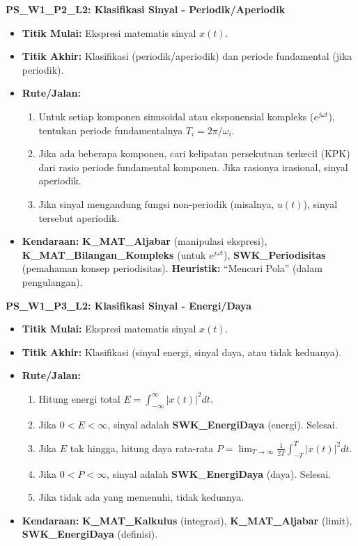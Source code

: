 \documentclass[
  letterpaper,
  DIV=11,
  numbers=noendperiod]{scrreprt}
\providecommand{\tightlist}{%
  \setlength{\itemsep}{0pt}\setlength{\parskip}{0pt}}\usepackage{longtable,booktabs,array}
\begin{document}
\textbf{PS\_W1\_P2\_L2: Klasifikasi Sinyal - Periodik/Aperiodik}

\begin{itemize}
\tightlist
\item
  \textbf{Titik Mulai:} Ekspresi matematis sinyal \(x(t)\).
\item
  \textbf{Titik Akhir:} Klasifikasi (periodik/aperiodik) dan periode
  fundamental (jika periodik).
\item
  \textbf{Rute/Jalan:}

  \begin{enumerate}
  \def\labelenumi{\arabic{enumi}.}
  \tightlist
  \item
    Untuk setiap komponen sinusoidal atau eksponensial kompleks
    (\(e^{j\omega t}\)), tentukan periode fundamentalnya
    \(T_i = 2\pi / \omega_i\).
  \item
    Jika ada beberapa komponen, cari kelipatan persekutuan terkecil
    (KPK) dari rasio periode fundamental komponen. Jika rasionya
    irasional, sinyal aperiodik.
  \item
    Jika sinyal mengandung fungsi non-periodik (misalnya, \(u(t)\)),
    sinyal tersebut aperiodik.
  \end{enumerate}
\item
  \textbf{Kendaraan:} \textbf{K\_MAT\_Aljabar} (manipulasi ekspresi),
  \textbf{K\_MAT\_Bilangan\_Kompleks} (untuk \(e^{j\omega t}\)),
  \textbf{SWK\_Periodisitas} (pemahaman konsep periodisitas).
  \textbf{Heuristik:} ``Mencari Pola'' (dalam pengulangan).
\end{itemize}

\textbf{PS\_W1\_P3\_L2: Klasifikasi Sinyal - Energi/Daya}

\begin{itemize}
\tightlist
\item
  \textbf{Titik Mulai:} Ekspresi matematis sinyal \(x(t)\).
\item
  \textbf{Titik Akhir:} Klasifikasi (sinyal energi, sinyal daya, atau
  tidak keduanya).
\item
  \textbf{Rute/Jalan:}

  \begin{enumerate}
  \def\labelenumi{\arabic{enumi}.}
  \tightlist
  \item
    Hitung energi total \(E = \int_{-\infty}^{\infty} |x(t)|^2 dt\).
  \item
    Jika \(0 < E < \infty\), sinyal adalah \textbf{SWK\_EnergiDaya}
    (energi). Selesai.
  \item
    Jika \(E\) tak hingga, hitung daya rata-rata
    \(P = \lim_{T \to \infty} \frac{1}{2T} \int_{-T}^{T} |x(t)|^2 dt\).
  \item
    Jika \(0 < P < \infty\), sinyal adalah \textbf{SWK\_EnergiDaya}
    (daya). Selesai.
  \item
    Jika tidak ada yang memenuhi, tidak keduanya.
  \end{enumerate}
\item
  \textbf{Kendaraan:} \textbf{K\_MAT\_Kalkulus} (integrasi),
  \textbf{K\_MAT\_Aljabar} (limit), \textbf{SWK\_EnergiDaya} (definisi).
\end{itemize}
\end{document}
